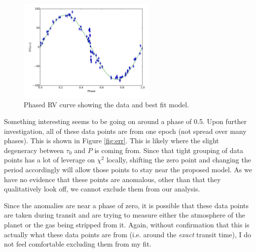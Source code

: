 \documentclass[11pt]{paper}
\begin{document}
\begin{figure}
\begin{center}
    \includegraphics[width=0.6\textwidth]{outputs/phrv.pdf}
    \caption{Phased RV curve showing the data and best fit model.}
    \label{fig:rv}
\end{center}
\end{figure}

Something interesting seems to be going on around a phase of 0.5. Upon further investigation, all of these data points are from one epoch (not spread over many phases). This is shown in Figure \ref{fig:err}. This is likely where the slight degeneracy between $\tau_0$ and $P$ is coming from. Since that tight grouping of data points has a lot of leverage on $\chi^2$ locally, shifting the zero point and changing the period accordingly will allow those points to stay near the proposed model. As we have no evidence that these points are anomalous, other than that they qualitatively look off, we cannot exclude them from our analysis. 

Since the anomalies are near a phase of zero, it is possible that these data points are taken during transit and are trying to measure either the atmosphere of the planet or the gas being stripped from it. Again, without confirmation that this is actually what these data points are from (i.e. around the \emph{exact} transit time), I do not feel comfortable excluding them from my fit.
\end{document}
